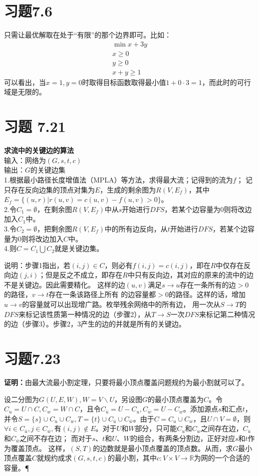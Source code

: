 \documentclass[a4paper,onecolumn,12pt]{article}
\numberwithin{equation}{section}
\begin{document}
\section*{习题7.6}
只需让最优解取在处于``有限''的那个边界即可。比如：
\begin{align*}
\min{x+3y}\\
x\ge 0\\
y\geq 0\\
x+y\geq 1
\end{align*}
可以看出，当$x=1,y=0$时取得目标函数取得最小值$1+0\cdot 3=1$，而此时的可行域是无限的。
\section*{习题 7.21}
\begin{boxedminipage}{.9\columnwidth}
\textbf{求流中的关键边的算法}\\
输入：网络为$(G,s,t,c)$\\
输出：$G$的关键边集\\
1.根据最小路径长度增值法（MPLA）等方法，求得最大流；记得到的流为$f$；
记只存在反向边集的顶点对集为$E$，生成的剩余图为$R(V,E_f)$，其中$E_f=\{(u,r)|r(u,v)=c(u,v)-f(u,v)>0\}$。\\
2.令$C_1=\emptyset$，在剩余图$R(V,E_f)$中从$s$开始进行$DFS$，若某个边容量为0则将改边加入$C_1$中。\\
3.令$C_2=\emptyset$，把剩余图$R(V,E_f)$中的所有边反向，从$t$开始进行$DFS$，若某个边容量为0则将改边加入$C$中。\\
4.则$C=C_1\bigcup C_2$就是关键边集。
\end{boxedminipage}\vskip11pt

说明：步骤1指出，若$(i,j)\in
  C$，则必有$f(i,j)=c(i,j)$，即在$R$中仅存在反向边$(j,i)$；但是反之不成立，即存在$R$中只有反向边，其对应的原来的流中的边不是关键边。因此需要精化。
这样的边$(u,v)$满足$s\rightarrow u$存在一条所有的边$>0$的路径，$v\rightarrow t$存在一条该路径上所有
的边容量都$>0$的路径。这样的话，增加$u\rightarrow v$的容量就可以出现增广路。枚举残余网络中的所有边，
用一次从$S\rightarrow T$的$DFS$来标记该性质第一种情况的边（步骤2），从$T\rightarrow
S$一次$DFS$来标记第二种情况的边（步骤3）。步骤2，3产生的边的并就是所有的关键边。

\section*{习题7.23}
\textbf{证明：}由最大流最小割定理，只要将最小顶点覆盖问题规约为最小割就可以了。

设二分图为$G(U,E,W),W=V\backslash
U$，另设图$G$的最小顶点覆盖为$C$。令$C_{u}=U\cap C,C_{w}=W\cap
C$，且令$C_{\bar{u}}=U-C_{u},C_{\bar{w}}=U-C_{w}$。添加源点$s$和汇点$t$，并令$S=\{s\}\cup
C_{u}\cup C_{w},T=\{t\}\cup C_{\bar{u}}\cup C_{\bar{w}}$。由于$C=C_{u}\cup
C_{w}$，且$U\cap V=\emptyset$，则$\forall i\in C_{\bar{u}},j\in
C_{\bar{w}}, \text{有}(i,j)\not\in
E$。对于$U$和$W$部分，只可能$C_{u}$和$C_{w}$之间存在边，$C_{\bar{u}}$和$C_{\bar{w}}$之间不存在边；
而对于$s$、$t$和$U$、$W$的组合，有两条分割边，正好对应$s$和$t$作为覆盖顶点。
这样，$(S,T)$的边数就是最小顶点覆盖的顶点数。从而，求$G$最小顶点覆盖$C$就规约成求$(G,s,t,c)$的最小割，其中$c:V\times
V\rightarrow \mathbb{R}$为网的一个合适的容量。\P
\end{document}
